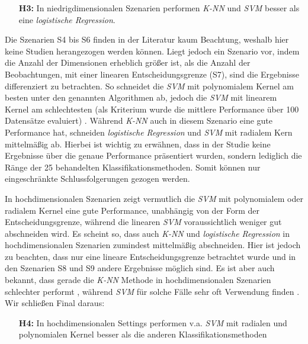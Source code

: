 \documentclass[
]{article}
\begin{document}
\begin{minipage}{0.9\linewidth}
\begin{itemize}[leftmargin=0.1\linewidth]
\item[\textbf{H3:}] In niedrigdimensionalen Szenarien performen \textit{K-NN} und \textit{SVM} besser als eine \textit{logistische Regression}.
\end{itemize}
\end{minipage}

Die Szenarien S4 bis S6 finden in der Literatur kaum Beachtung, weshalb
hier keine Studien herangezogen werden können. Liegt jedoch ein Szenario
vor, indem die Anzahl der Dimensionen erheblich größer ist, als die
Anzahl der Beobachtungen, mit einer linearen Entscheidungsgrenze (S7),
sind die Ergebnisse differenziert zu betrachten. So schneidet die
\textit{SVM} mit polynomialem Kernel am besten unter den genannten
Algorithmen ab, jedoch die \textit{SVM} mit linearem Kernel am
schlechtesten (als Kriterium wurde die mittlere Performance über 100
Datensätze evaluiert)
\parencite{scholzComparisonClassificationMethods2021}. Während
\textit{K-NN} auch in diesem Szenario eine gute Performance hat,
schneiden \textit{logistische Regression} und \textit{SVM} mit radialem
Kern mittelmäßig ab. Hierbei ist wichtig zu erwähnen, dass in der Studie
keine Ergebnisse über die genaue Performance präsentiert wurden, sondern
lediglich die Ränge der 25 behandelten Klassifikationsmethoden. Somit
können nur eingeschränkte Schlussfolgerungen gezogen werden.

In hochdimensionalen Szenarien zeigt vermutlich die \textit{SVM} mit
polynomialem oder radialem Kernel eine gute Performance, unabhängig von
der Form der Entscheidungsgrenze, während die linearen \textit{SVM}
voraussichtlich weniger gut abschneiden wird. Es scheint so, dass auch
\textit{K-NN} und \textit{logistische Regression} in hochdimensionalen
Szenarien zumindest mittelmäßig abschneiden. Hier ist jedoch zu
beachten, dass nur eine lineare Entscheidungsgrenze betrachtet wurde und
in den Szenarien S8 und S9 andere Ergebnisse möglich sind. Es ist aber
auch bekannt, dass gerade die \textit{K-NN} Methode in hochdimensionalen
Szenarien schlechter performt
\parencite{jamesIntroductionStatisticalLearning2021}, während
\textit{SVM} für solche Fälle sehr oft Verwendung finden
\parencite{moguerzaSupportVectorMachines2006}. Wir schließen Final
daraus:

\begin{minipage}{0.9\linewidth}
\begin{itemize}[leftmargin=0.1\linewidth]
\item[\textbf{H4:}] In hochdimensionalen Settings performen v.a. \textit{SVM} mit radialen und polynomialen Kernel besser als die anderen Klassifikationsmethoden
\end{itemize}
\end{minipage}
\end{document}
